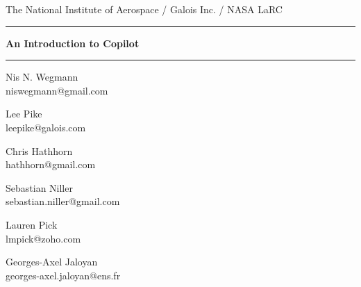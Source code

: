 \documentclass[12pt]{article}
\theoremstyle{example}
\newcommand{\HRule}{\rule{\linewidth}{0.25pt}}
\begin{document}
\thispagestyle{empty}

\begin{center}

The National Institute of Aerospace / Galois Inc. / NASA LaRC

\vspace{0.1cm}

\HRule

\vspace{0.6cm}

{\Huge \bfseries
An Introduction to Copilot
}
\HRule

\vspace{0.6cm}

\begin{minipage}{0.3\textwidth}
\large
\begin{center}
Nis N. Wegmann\\
\small{
niswegmann@gmail.com\\
}

\end{center}
\end{minipage}
\begin{minipage}{0.3\textwidth}
\large
\begin{center}
Lee Pike\\
\small{
leepike@galois.com\\
}
\end{center}
\end{minipage}
\vspace{1cm}



\begin{minipage}{0.3\textwidth}
\large
\begin{center}
Chris Hathhorn \\
\small{
hathhorn@gmail.com\\
}
\end{center}
\end{minipage}
\begin{minipage}{0.3\textwidth}
\large
\begin{center}
Sebastian Niller\\
\small{
sebastian.niller@gmail.com\\
}
\end{center}
\end{minipage}

\vspace{1cm}

\begin{minipage}{0.3\textwidth}
\large
\begin{center}
Lauren Pick\\
\small{
lmpick@zoho.com\\
}
\end{center}
\end{minipage}
\begin{minipage}{0.3\textwidth}
\large
\begin{center}
Georges-Axel Jaloyan \\
\small{
georges-axel.jaloyan@ens.fr\\
}
\end{center}
\end{minipage}


\end{center}
\end{document}
